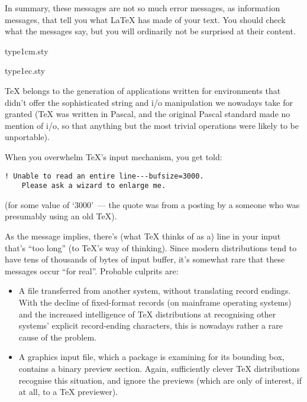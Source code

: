 {In summary, these messages are not so much error messages, as
information messages, that tell you what \LaTeX{} has made of your
text.  You should check what the messages say, but you will ordinarily
not be surprised at their content.
\begin{ctanrefs}
\item[type1cm.sty]
\item[type1ec.sty]
\end{ctanrefs}


\TeX{} belongs to the generation of applications written for
environments that didn't offer the sophisticated string and i/o
manipulation we nowadays take for granted (\TeX{} was written in
Pascal, and the original Pascal standard made no mention of i/o, so
that anything but the most trivial operations were likely to be
unportable).

When you overwhelm \TeX{}'s input mechanism, you get told:
\begin{verbatim}
! Unable to read an entire line---bufsize=3000.
    Please ask a wizard to enlarge me.
\end{verbatim}
(for some value of `3000'~--- the quote was from a
 posting by a someone who was presumably
using an old \TeX{}).

As the message implies, there's (what \TeX{} thinks of as a) line in
your input that's ``too long'' (to \TeX{}'s way of thinking).  Since
modern distributions tend to have tens of thousands of bytes of input
buffer, it's somewhat rare that these messages occur ``for real''.
Probable culprits are:
\begin{itemize}
\item A file transferred from another system, without translating
  record endings.  With the decline of fixed-format records (on
  mainframe operating systems) and the increased intelligence of
  \TeX{} distributions at recognising other systems' explicit
  record-ending characters, this is nowadays rather a rare cause of
  the problem.
\item A graphics input file, which a package is examining for its
  bounding box, contains a binary preview section.  Again,
  sufficiently clever \TeX{} distributions recognise this situation,
  and ignore the previews (which are only of interest, if at all, to a
  \TeX{} previewer).
\end{itemize}

}
